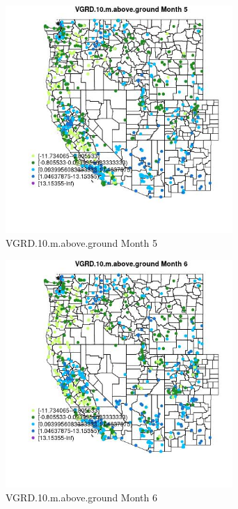 \begin{figure} 
\centering  
\includegraphics[width=0.77\textwidth]{Code_Outputs/Report_ML_input_PM25_Step4_part_f_de_duplicated_aves_prioritize_24hr_obswNAs_MapObsMo5VGRD10maboveground.jpg} 
\caption{\label{fig:Report_ML_input_PM25_Step4_part_f_de_duplicated_aves_prioritize_24hr_obswNAsMapObsMo5VGRD10maboveground}VGRD.10.m.above.ground Month 5} 
\end{figure} 
 

\begin{figure} 
\centering  
\includegraphics[width=0.77\textwidth]{Code_Outputs/Report_ML_input_PM25_Step4_part_f_de_duplicated_aves_prioritize_24hr_obswNAs_MapObsMo6VGRD10maboveground.jpg} 
\caption{\label{fig:Report_ML_input_PM25_Step4_part_f_de_duplicated_aves_prioritize_24hr_obswNAsMapObsMo6VGRD10maboveground}VGRD.10.m.above.ground Month 6} 
\end{figure} 
 

